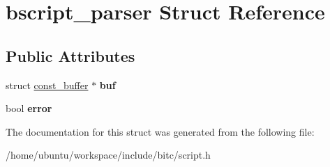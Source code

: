 \hypertarget{structbscript__parser}{\section{bscript\-\_\-parser Struct Reference}
\label{structbscript__parser}
}
\subsection*{Public Attributes}
\begin{DoxyCompactItemize}
\item 
\hypertarget{structbscript__parser_a9d0546d523facdd40b8fafba65fed25d}{struct \hyperlink{structconst__buffer}{const\-\_\-buffer} $\ast$ {\bfseries buf}}\label{structbscript__parser_a9d0546d523facdd40b8fafba65fed25d}

\item 
\hypertarget{structbscript__parser_a8e50a92e2efc7218a58ae378429538fd}{bool {\bfseries error}}\label{structbscript__parser_a8e50a92e2efc7218a58ae378429538fd}

\end{DoxyCompactItemize}


The documentation for this struct was generated from the following file\-:\begin{DoxyCompactItemize}
\item 
/home/ubuntu/workspace/include/bitc/script.\-h\end{DoxyCompactItemize}
